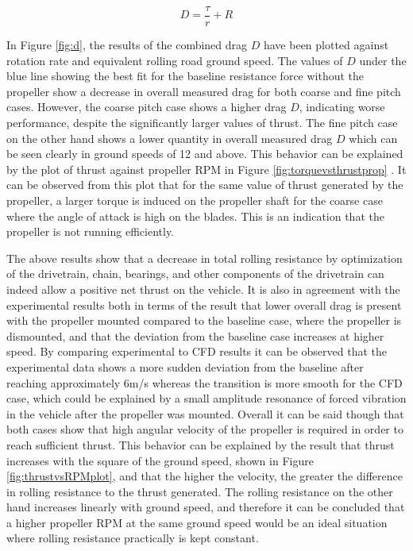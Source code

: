 \begin{equation}
    D = \frac{\tau}{r}+R
\end{equation}

In Figure \ref{fig:d}, the results of the combined drag $D$ have been plotted against rotation rate and equivalent rolling road ground speed. The values of $D$ under the blue line showing the best fit for the baseline resistance force without the propeller show a decrease in overall measured drag for both coarse and fine pitch cases. However, the coarse pitch case shows a higher drag $D$, indicating worse performance, despite the significantly larger values of thrust. The fine pitch case on the other hand shows a lower quantity in overall measured drag $D$ which can be seen clearly in ground speeds of 12 and above. This behavior can be explained by the plot of thrust against propeller RPM in Figure \ref{fig:torquevsthrustprop} . It can be observed from this plot that for the same value of thrust generated by the propeller, a larger torque is induced on the propeller shaft for the coarse case where the angle of attack is high on the blades. This is an indication that the propeller is not running efficiently.

The above results show that a decrease in total rolling resistance by optimization of the drivetrain, chain, bearings, and other components of the drivetrain can indeed allow a positive net thrust on the vehicle.  It is also in agreement with the experimental results both in terms of the result that lower overall drag is present with the propeller mounted compared to the baseline case, where the propeller is dismounted, and that the deviation from the baseline case increases at higher speed. By comparing experimental to CFD results it can be observed that the experimental data shows a more sudden deviation from the baseline after reaching approximately 6m/s whereas the transition is more smooth for the CFD case, which could be explained by a small amplitude resonance of forced vibration in the vehicle after the propeller was mounted. Overall it can be said though that both cases show that high angular velocity of the propeller is required in order to reach sufficient thrust. This behavior can be explained by the result that thrust increases with the square of the ground speed, shown in Figure \ref{fig:thrustvsRPMplot}, and that the higher the velocity, the greater the difference in rolling resistance to the thrust generated. The rolling resistance on the other hand increases linearly with ground speed, and therefore it can be concluded that a higher propeller RPM at the same ground speed would be an ideal situation where rolling resistance practically is kept constant. 

